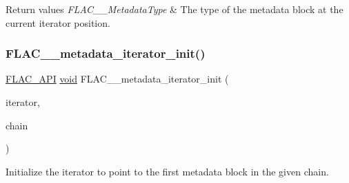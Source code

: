 \begin{DoxyRetVals}{Return values}
{\em F\+L\+A\+C\+\_\+\+\_\+\+Metadata\+Type} & The type of the metadata block at the current iterator position. \\
\hline
\end{DoxyRetVals}
\mbox{\label{group__flac__metadata__level2_ga4a5af69a1f19436b02f738eb8c97c959}} 
\subsubsection{\texorpdfstring{FLAC\_\_metadata\_iterator\_init()}{FLAC\_\_metadata\_iterator\_init()}}
{\footnotesize\ttfamily \mbox{\hyperlink{group__flac__export_ga56ca07df8a23310707732b1c0007d6f5}{F\+L\+A\+C\+\_\+\+A\+PI}} \mbox{\hyperlink{_s_d_l__opengles2__gl2ext_8h_ae5d8fa23ad07c48bb609509eae494c95}{void}} F\+L\+A\+C\+\_\+\+\_\+metadata\+\_\+iterator\+\_\+init (\begin{DoxyParamCaption}\item[{\mbox{\hyperlink{group__flac__metadata__level2_ga9f3e135a07cdef7e51597646aa7b89b2}{F\+L\+A\+C\+\_\+\+\_\+\+Metadata\+\_\+\+Iterator}} $\ast$}]{iterator,  }\item[{\mbox{\hyperlink{group__flac__metadata__level2_gaec6993c60b88f222a52af86f8f47bfdf}{F\+L\+A\+C\+\_\+\+\_\+\+Metadata\+\_\+\+Chain}} $\ast$}]{chain }\end{DoxyParamCaption})}

Initialize the iterator to point to the first metadata block in the given chain.



